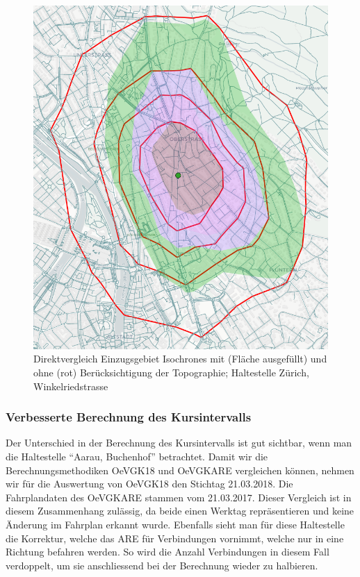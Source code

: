 \begin{figure}[ht]
    \centering
    \includegraphics[width=0.8\linewidth]{technicalreport/img/vergleich_wegfuehrung_isochrone_mit_ohne_topo.png}
    \caption[Direktvergleich Einzugsgebiet Isochronen mit und ohne Topographie]{Direktvergleich Einzugsgebiet \glspl{Isochrone} mit (Fläche ausgefüllt) und ohne (rot) Berücksichtigung der Topographie; Haltestelle Zürich, Winkelriedstrasse}
    \label{fig:vergleich_wegfuehrung_isochrone_mit_ohne_topo}
\end{figure}


\subsubsection{Verbesserte Berechnung des Kursintervalls}

Der Unterschied in der Berechnung des Kursintervalls ist gut sichtbar, wenn man die \gls{Haltestelle} "`Aarau, Buchenhof"' betrachtet.
Damit wir die Berechnungsmethodiken \gls{OeVGK18} und \gls{OeVGKARE} vergleichen können, nehmen wir für die Auswertung von \gls{OeVGK18} den Stichtag 21.03.2018. Die Fahrplandaten des \gls{OeVGKARE} stammen vom 21.03.2017.
Dieser Vergleich ist in diesem Zusammenhang zulässig, da beide einen Werktag repräsentieren und keine Änderung im Fahrplan erkannt wurde.
Ebenfalls sieht man für diese \gls{Haltestelle} die Korrektur, welche das \ac{ARE} für Verbindungen vornimmt, welche nur in eine Richtung befahren werden.
So wird die Anzahl Verbindungen in diesem Fall verdoppelt, um sie anschliessend bei der Berechnung wieder zu halbieren.

